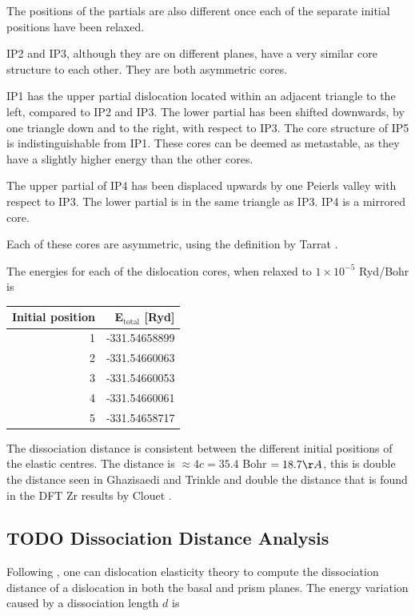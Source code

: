 \documentclass[11pt]{article}
\begin{document}
The positions of the partials are also different once each of the
separate initial positions have been relaxed. 


IP2 and IP3, although they are on different planes, have a very
similar core structure to each other. They are both asymmetric
cores. 


IP1 has the upper partial dislocation located within an adjacent
triangle to the left, compared to IP2 and IP3. The lower partial
has been shifted downwards, by one triangle down and to the right,
with respect to IP3. The core structure of IP5 is
indistinguishable from IP1. These cores can be deemed as
metastable, as they have a slightly higher energy than the other
cores.


The upper partial of IP4 has been displaced upwards by one Peierls
valley with respect to IP3. The lower partial is in the same
triangle as IP3. IP4 is a mirrored core. 


Each of these cores are asymmetric, using the definition by Tarrat
\cite{Tarrat2009}. 

The energies for each of the dislocation cores, when relaxed to
\(1\times 10^{-5}\) Ryd/Bohr is 

\begin{center}
\begin{tabular}{rr}
Initial position & E\(_{\text{total}}\) [Ryd]\\
\hline
1 & -331.54658899\\
2 & -331.54660063\\
3 & -331.54660053\\
4 & -331.54660061\\
5 & -331.54658717\\
\end{tabular}
\end{center}




The dissociation distance is consistent between the different
initial positions of the elastic centres. The distance is \(\approx 4c =
    35.4\) Bohr \(= 18.7 \AA\), this is double the distance seen in
Ghazisaedi and Trinkle \cite{Ghazisaeidi2012} and double the
distance that is found in the DFT Zr results by Clouet
\cite{Clouet2012}.



\subsection{{\bfseries\sffamily TODO} Dissociation Distance Analysis}
\label{sec:org460a5ee}
Following \cite{Clouet2012}, one can dislocation elasticity theory to
compute the dissociation distance of a dislocation in both the
basal and prism planes.  The energy variation caused by a
dissociation length \(d\) is
\end{document}

